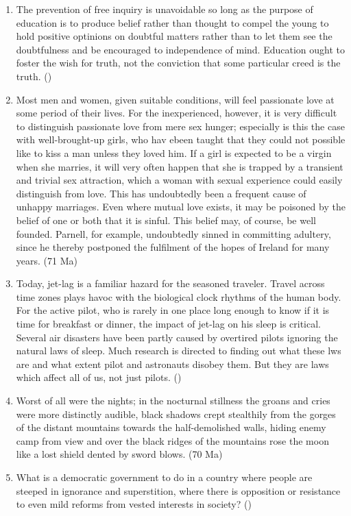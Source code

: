 \documentclass[12pt]{article}
\begin{document}
\begin{enumerate}
    \item The prevention of free inquiry is unavoidable so long as the purpose of education is to produce belief rather than thought to compel the young to hold positive optinions on doubtful matters rather than to let them see the doubtfulness and be encouraged to independence of mind. Education ought to foster the wish for truth, not the conviction that some particular creed is the truth. \hfill ()

    \item Most men and women, given suitable conditions, will feel passionate love at some period of their lives. For the inexperienced, however, it is very difficult to distinguish passionate love from mere sex hunger; especially is this the case with well-brought-up girls, who hav ebeen taught that they could not possible like to kiss a man unless they loved him. If a girl is expected to be a virgin when she marries, it will very often happen that she is trapped by a transient and trivial sex attraction, which a woman with sexual experience could easily distinguish from love. This has undoubtedly been a frequent cause of unhappy marriages. Even where mutual love exists, it may be poisoned by the belief of one or both that it is sinful. This belief may, of course, be well founded. Parnell, for example, undoubtedly sinned in committing adultery, since he thereby postponed the fulfilment of the hopes of Ireland for many years. \hfill (71 Ma)

    \item Today, jet-lag is a familiar hazard for the seasoned traveler. Travel across time zones plays havoc with the biological clock rhythms of the human body. For the active pilot, who is rarely in one place long enough to know if it is time for breakfast or dinner, the impact of jet-lag on his sleep is critical. Several air disasters have been partly caused by overtired pilots ignoring the natural laws of sleep. Much research is directed to finding out what these lws are and what extent pilot and astronauts disobey them. But they are laws which affect all of us, not just pilots. \hfill ()

    \item Worst of all were the nights; in the nocturnal stillness the groans and cries were more distinctly audible, black shadows crept stealthily from the gorges of the distant mountains towards the half-demolished walls, hiding enemy camp from view and over the black ridges of the mountains rose the moon like a lost shield dented by sword blows. \hfill (70 Ma)

    \item What is a democratic government to do in a country where people are steeped in ignorance and superstition, where there is opposition or resistance to even mild reforms from vested interests in society? \hfill ()

  \end{enumerate}
 
\end{document}
